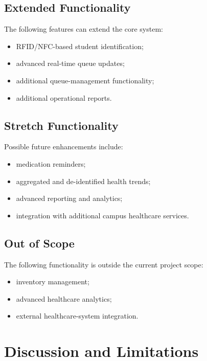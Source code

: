 \documentclass{tietreport}
\begin{document}
\section{Extended Functionality}

The following features can extend the core system:

\begin{itemize}
    \item RFID/NFC-based student identification;
    \item advanced real-time queue updates;
    \item additional queue-management functionality;
    \item additional operational reports.
\end{itemize}

\section{Stretch Functionality}

Possible future enhancements include:

\begin{itemize}
    \item medication reminders;
    \item aggregated and de-identified health trends;
    \item advanced reporting and analytics;
    \item integration with additional campus healthcare services.
\end{itemize}

\section{Out of Scope}

The following functionality is outside the current project scope:

\begin{itemize}
    \item inventory management;
    \item advanced healthcare analytics;
    \item external healthcare-system integration.
\end{itemize}



\chapter{Discussion and Limitations}
\end{document}

